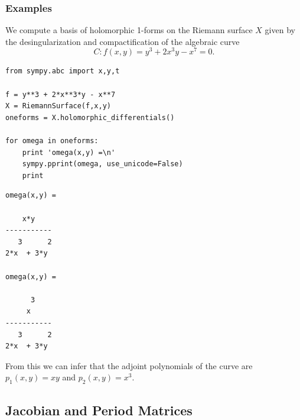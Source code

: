%
\subsubsection*{Examples}
%

We compute a basis of holomorphic 1-forms on the Riemann surface $X$ given by
the desingularization and compactification of the algebraic curve
\[
  C : f(x,y) = y^3 + 2x^3y - x^7 = 0.
\]
\begin{lstlisting}
from sympy.abc import x,y,t

f = y**3 + 2*x**3*y - x**7
X = RiemannSurface(f,x,y)
oneforms = X.holomorphic_differentials()

for omega in oneforms:
    print 'omega(x,y) =\n'
    sympy.pprint(omega, use_unicode=False)
    print
\end{lstlisting}
\begin{lstlisting}
omega(x,y) =

    x*y    
-----------
   3      2
2*x  + 3*y 

omega(x,y) =

      3    
     x     
-----------
   3      2
2*x  + 3*y
\end{lstlisting}
From this we can infer that the adjoint polynomials of the curve are $p_1(x,y) =
xy$ and $p_2(x,y) = x^3$.


\subsection{Jacobian and Period
  Matrices}\label{subsec:background-jacobian-and-period-matrices}

